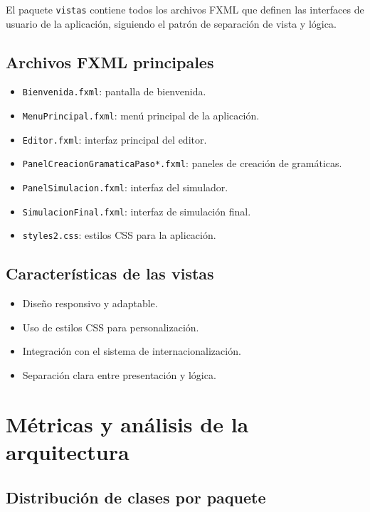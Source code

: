 El paquete \texttt{vistas} contiene todos los archivos FXML que definen las interfaces de usuario de la aplicación, siguiendo el patrón de separación de vista y lógica.

\subsection{Archivos FXML principales}

\begin{itemize}
    \item \texttt{Bienvenida.fxml}: pantalla de bienvenida.
    \item \texttt{MenuPrincipal.fxml}: menú principal de la aplicación.
    \item \texttt{Editor.fxml}: interfaz principal del editor.
    \item \texttt{PanelCreacionGramaticaPaso*.fxml}: paneles de creación de gramáticas.
    \item \texttt{PanelSimulacion.fxml}: interfaz del simulador.
    \item \texttt{SimulacionFinal.fxml}: interfaz de simulación final.
    \item \texttt{styles2.css}: estilos CSS para la aplicación.
\end{itemize}

\subsection{Características de las vistas}

\begin{itemize}
    \item Diseño responsivo y adaptable.
    \item Uso de estilos CSS para personalización.
    \item Integración con el sistema de internacionalización.
    \item Separación clara entre presentación y lógica.
\end{itemize}

\section{Métricas y análisis de la arquitectura}

\subsection{Distribución de clases por paquete}

